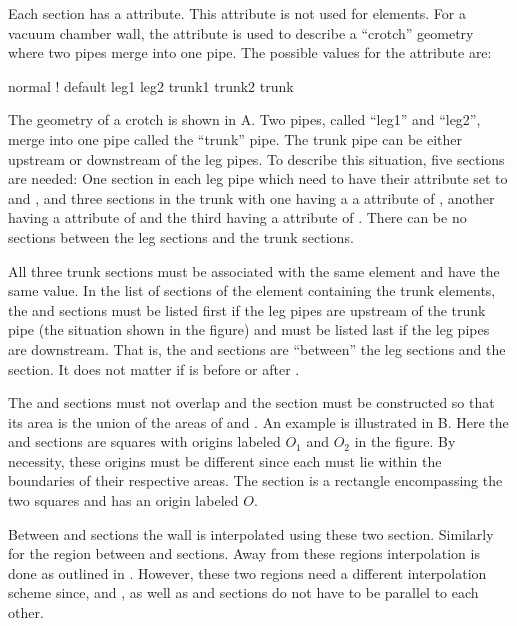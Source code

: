 
Each section has a  attribute. This attribute is not used for  elements. For
a vacuum chamber wall, the  attribute is used to describe a ``crotch'' geometry where two
pipes merge into one pipe. The possible values for the  attribute are:
\begin{example}
  normal     ! default
  leg1
  leg2
  trunk1
  trunk2
  trunk
\end{example}
The geometry of a crotch is shown in A. Two pipes, called ``leg1'' and ``leg2'', merge
into one pipe called the ``trunk'' pipe.  The trunk pipe can be either upstream or downstream of the
leg pipes.  To describe this situation, five sections are needed: One section in each leg pipe which
need to have their  attribute set to  and , and three sections in the
trunk with one having a a  attribute of , another having a  attribute
of  and the third having a  attribute of . There can be no sections
between the leg sections and the trunk sections.

All three trunk sections must be associated with the same element and have the same  value. In
the list of sections of the element containing the trunk elements, the  and 
sections must be listed first if the leg pipes are upstream of the trunk pipe (the situation shown
in the figure) and must be listed last if the leg pipes are downstream. That is, the  and
 sections are ``between'' the leg sections and the  section. It does not matter
if  is before or after .

The  and  sections must not overlap and the  section must be
constructed so that its area is the union of the areas of  and . An example is
illustrated in B. Here the  and  sections are squares with
origins labeled $O_1$ and $O_2$ in the figure. By necessity, these origins must be different since
each must lie within the boundaries of their respective areas. The  section is a rectangle
encompassing the two squares and has an origin labeled $O$.

Between  and  sections the wall is interpolated using these two
section. Similarly for the region between  and  sections. Away from these
regions interpolation is done as outlined in . However, these two regions
need a different interpolation scheme since,  and , as well as  and
 sections do not have to be parallel to each other.

